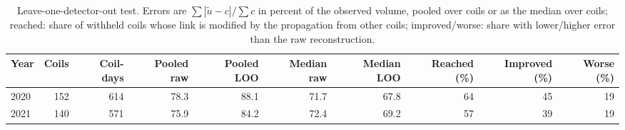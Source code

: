 \begin{table}[htbp]\centering
\caption{Leave-one-detector-out test. Errors are $\sum|\tilde u-c|/\sum c$ in percent of the observed volume, pooled over coils or as the median over coils; reached: share of withheld coils whose link is modified by the propagation from other coils; improved/worse: share with lower/higher error than the raw reconstruction.}
\label{tab:loo}
\begin{tabular}{@{}lrrrrrrrrr@{}}\toprule
Year & Coils & Coil-days & Pooled raw & Pooled LOO & Median raw & Median LOO & Reached (\%) & Improved (\%) & Worse (\%) \\\midrule
2020 & 152 & 614 & 78.3 & 88.1 & 71.7 & 67.8 & 64 & 45 & 19 \\
2021 & 140 & 571 & 75.9 & 84.2 & 72.4 & 69.2 & 57 & 39 & 19 \\
\bottomrule\end{tabular}\end{table}
